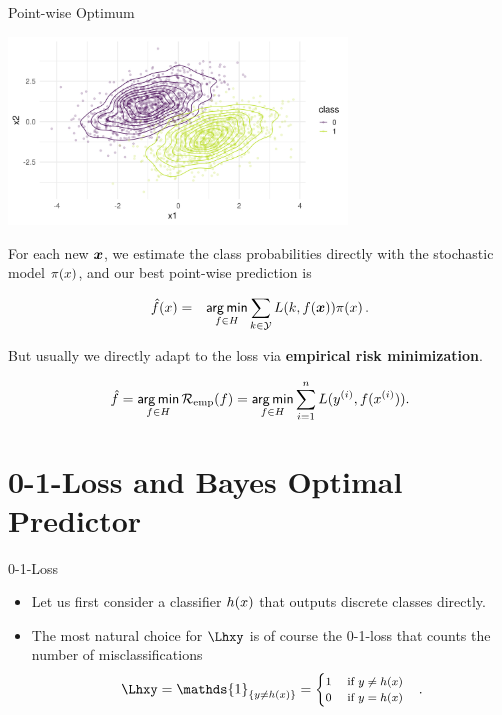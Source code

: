\begin{vbframe}{Point-wise Optimum}
\begin{center}
\includegraphics[width = 9cm ]{figure_man/bayes_error_2.png} \\
\end{center}

For each new $\bm{x}$, we estimate the class probabilities directly with the stochastic model $\pi(x)$, and our best point-wise prediction is 

\begin{eqnarray*}
  \hat{f}(x) &=& \mathop{\sf arg\,min}_{f \in H} \sum_{k \in \mathcal{Y}} L(k, f(\bm{x})) \pi(x)\,.  \\
\end{eqnarray*}


\lz 

But usually we directly adapt to the loss via \textbf{empirical risk minimization}. 

$$
\hat{f} = \mathop{\sf arg\,min}_{f \in H} \mathcal{R}_{\text{emp}}(f) = \mathop{\sf arg\,min}_{f \in H} \sum_{i=1}^n L(y^{(i)}, f(x^{(i)})).
$$
  

\end{vbframe}

\section{0-1-Loss and Bayes Optimal Predictor}

\begin{vbframe}{0-1-Loss}

\begin{itemize}
  \item Let us first consider a classifier $h(x)$ that outputs discrete classes directly. 
  \item The most natural choice for $\Lhxy$ is of course the 0-1-loss that counts the number of misclassifications
  $$
  \Lhxy = \mathds{1}_{\{y \ne \hx\}} =
     \footnotesize \begin{cases} 1 \quad \text{ if } y \ne \hx \\ 0 \quad    \text{ if } y = \hx  \end{cases}.
  $$

\end{itemize}


\end{vbframe}


